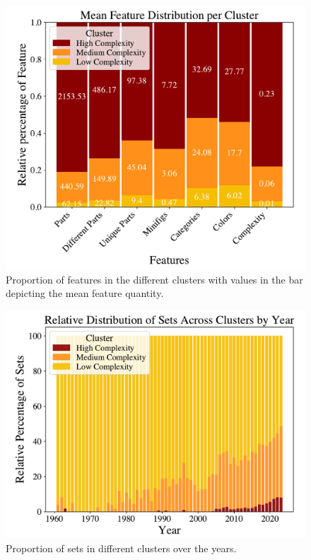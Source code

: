\documentclass{article}
\theoremstyle{plain}
\theoremstyle{definition}
\theoremstyle{remark}
\begin{document}
	\begin{figure}[H]
		\vskip 0.2in
		\begin{center}
			\centerline{\includegraphics[width=\columnwidth]{../Images/Clusters_features.pdf}}
			\caption{Proportion of features in the different clusters with values in the bar depicting the mean feature quantity.}
			\label{icml-historical}
		\end{center}
		\vskip -0.2in
	\end{figure}
	\begin{figure}[H]
		\vskip 0.2in
		\begin{center}
			\centerline{\includegraphics[width=\columnwidth]{../Images/Clusters.pdf}}
			\caption{Proportion of sets in different clusters over the years.}
			\label{icml-historical}
		\end{center}
		\vskip -0.2in
	\end{figure}
	
\end{document}
